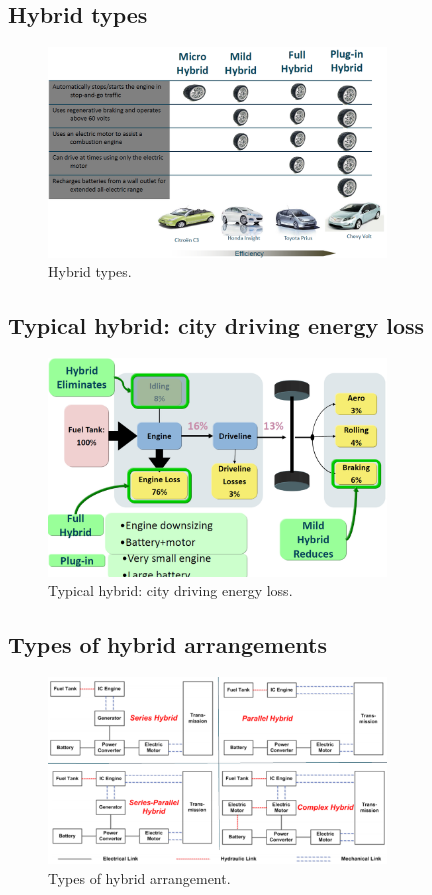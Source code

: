 \subsection{Hybrid types}
\begin{figure}[H]
    \centering
    \includegraphics[width = 0.8\textwidth]{img/figure98.png}
    \caption{Hybrid types.}
\end{figure}
\subsection{Typical hybrid: city driving energy loss}
\begin{figure}[H]
    \centering
    \includegraphics[width = 0.8\textwidth]{img/figure99.png}
    \caption{Typical hybrid: city driving energy loss.}
\end{figure}
\subsection{Types of hybrid arrangements}
\begin{figure}[H]
    \centering
    \includegraphics[width = 0.8\textwidth]{img/figure100.png}
    \caption{Types of hybrid arrangement.}
\end{figure}
